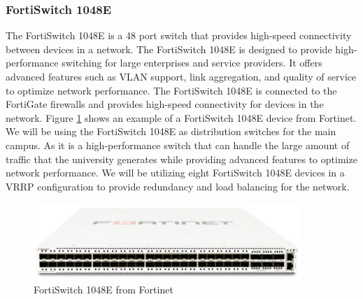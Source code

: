 \documentclass[12pt]{report}
\begin{document}
\subsubsection{FortiSwitch 1048E}
The FortiSwitch 1048E is a 48 port switch that provides high-speed connectivity between devices in a network. The FortiSwitch 1048E is designed to provide high-performance switching for large enterprises and service providers. It offers advanced features such as VLAN support, link aggregation, and quality of service to optimize network performance. The FortiSwitch 1048E is connected to the FortiGate firewalls and provides high-speed connectivity for devices in the network\cite{1048E}. Figure \ref{fig:1048E} shows an example of a FortiSwitch 1048E device from Fortinet. We will be using the FortiSwitch 1048E as distribution switches for the main campus. As it is a high-performance switch that can handle the large amount of traffic that the university generates while providing advanced features to optimize network performance. We will be utilizing eight FortiSwitch 1048E devices in a VRRP configuration to provide redundancy and load balancing for the network.
\begin{figure}[h]
    \centering
    \includegraphics[width=0.9\textwidth]{images/1048E.png}
    \caption{FortiSwitch 1048E from Fortinet \cite{1048EIMG}}
    \label{fig:1048E}
\end{figure}
\end{document}
